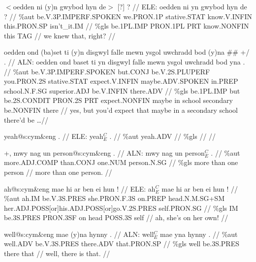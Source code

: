 \documentclass[a4paper,10pt]{article}
\begin{document}
\ex
\begingl[lingstyle=gergl]
\glchat $<$oedden ni (y)n gwybod hyn de$>$ [?] ? //
\glsurface ELE:  oedden ni yn gwybod hyn de ?  //
\glauto \%aut  be{\scriptsize .V.3P.IMPERF.SPOKEN} we{\scriptsize .PRON.1P} stative{\scriptsize .STAT} know{\scriptsize .V.INFIN} this{\scriptsize .PRON.SP} isn't\_it{\scriptsize .IM}   //
\glmanual \%gls  be{\scriptsize .1PL.IMP} PRON{\scriptsize .1PL} PRT know{\scriptsize .NONFIN} this TAG   //
\gleng we knew that, right? //
\endgl
\xe

\ex
\begingl[lingstyle=gergl]
\glchat oedden ond (ba)set ti (y)n disgwyl falle mewn ysgol uwchradd bod (y)na \#\# +/ . //
\glsurface ALN:  oedden ond baset ti yn disgwyl falle mewn ysgol uwchradd bod yna .  //
\glauto \%aut  be{\scriptsize .V.3P.IMPERF.SPOKEN} but{\scriptsize .CONJ} be{\scriptsize .V.2S.PLUPERF} you{\scriptsize .PRON.2S} stative{\scriptsize .STAT} expect{\scriptsize .V.INFIN} maybe{\scriptsize .ADV.SPOKEN} in{\scriptsize .PREP} school{\scriptsize .N.F.SG} superior{\scriptsize .ADJ} be{\scriptsize .V.INFIN} there{\scriptsize .ADV}   //
\glmanual \%gls  be{\scriptsize .1PL.IMP} but be{\scriptsize .2S.CONDIT} PRON{\scriptsize .2S} PRT expect{\scriptsize .NONFIN} maybe in school secondary be{\scriptsize .NONFIN} there   //
\gleng yes, but you'd expect that maybe in a secondary school there'd be \dots  //
\endgl
\xe

\ex
\begingl[lingstyle=gergl]
\glchat yeah@s:cym\&eng . //
\glsurface ELE:  yeah$^{C}_{E}$ .  //
\glauto \%aut  yeah{\scriptsize .ADV}   //
\glmanual \%gls     //
\gleng  //
\endgl
\xe

\ex
\begingl[lingstyle=gergl]
\glchat +, mwy nag un person@s:cym\&eng . //
\glsurface ALN:  mwy nag un person$^{C}_{E}$ .  //
\glauto \%aut  more{\scriptsize .ADJ.COMP} than{\scriptsize .CONJ} one{\scriptsize .NUM} person{\scriptsize .N.SG}   //
\glmanual \%gls  more than one person   //
\gleng more than one person. //
\endgl
\xe

\ex
\begingl[lingstyle=gergl]
\glchat ah@s:cym\&eng mae hi ar ben ei hun ! //
\glsurface ELE:  ah$^{C}_{E}$ mae hi ar ben ei hun !  //
\glauto \%aut  ah{\scriptsize .IM} be{\scriptsize .V.3S.PRES} she{\scriptsize .PRON.F.3S} on{\scriptsize .PREP} head{\scriptsize .N.M.SG+SM} her{\scriptsize .ADJ.POSS[or]his.ADJ.POSS[or]go.V.2S.PRES} self{\scriptsize .PRON.SG}   //
\glmanual \%gls  IM be{\scriptsize .3S.PRES} PRON{\scriptsize .3SF} on head POSS{\scriptsize .3S} self   //
\gleng ah, she's on her own! //
\endgl
\xe

\ex
\begingl[lingstyle=gergl]
\glchat well@s:cym\&eng mae (y)na hynny . //
\glsurface ALN:  well$^{C}_{E}$ mae yna hynny .  //
\glauto \%aut  well{\scriptsize .ADV} be{\scriptsize .V.3S.PRES} there{\scriptsize .ADV} that{\scriptsize .PRON.SP}   //
\glmanual \%gls  well be{\scriptsize .3S.PRES} there that   //
\gleng well, there is that. //
\endgl
\xe
\end{document}
